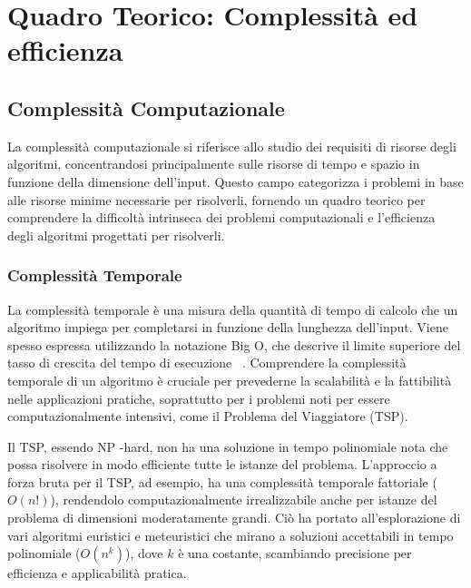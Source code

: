 
%

\chapter{Quadro Teorico: Complessità ed efficienza}\label{chapt:2}



\section{Complessità Computazionale}

La complessità computazionale si riferisce allo studio dei requisiti di risorse degli algoritmi, concentrandosi principalmente sulle risorse di tempo e spazio in funzione della dimensione dell'input. Questo campo categorizza i problemi in base alle risorse minime necessarie per risolverli, fornendo un quadro teorico per comprendere la difficoltà intrinseca dei problemi computazionali e l'efficienza degli algoritmi progettati per risolverli. ~\cite{GareyJohnson1979}

\subsection{Complessità Temporale}

La complessità temporale è una misura della quantità di tempo di calcolo che un algoritmo impiega per completarsi in funzione della lunghezza dell'input. Viene spesso espressa utilizzando la notazione Big O, che descrive il limite superiore del tasso di crescita del tempo di esecuzione ~\cite{BigONotation}. Comprendere la complessità temporale di un algoritmo è cruciale per prevederne la scalabilità e la fattibilità nelle applicazioni pratiche, soprattutto per i problemi noti per essere computazionalmente intensivi, come il Problema del Viaggiatore (TSP).

Il \gls{TSP}, essendo \gls{NP} -hard, non ha una soluzione in tempo polinomiale nota che possa risolvere in modo efficiente tutte le istanze del problema. L'approccio a forza bruta per il \gls{TSP}, ad esempio, ha una complessità temporale fattoriale (\(O(n!)\)), rendendolo computazionalmente irrealizzabile anche per istanze del problema di dimensioni moderatamente grandi. Ciò ha portato all'esplorazione di vari algoritmi euristici e meteuristici che mirano a soluzioni accettabili in tempo polinomiale (\(O(n^k)\)), dove \(k\) è una costante, scambiando precisione per efficienza e applicabilità pratica.~\cite{Dorigo1996}



